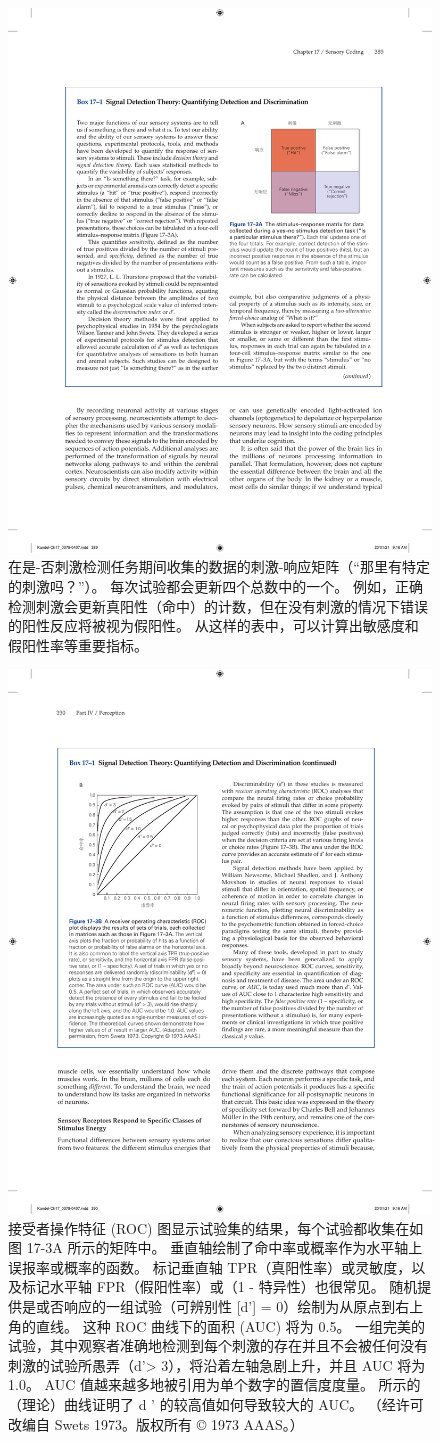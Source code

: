 \begin{figure}[htbp]
	\centering
	\includegraphics[width=0.5\linewidth]{chap17/fig_17_3_a}
	\caption{在是-否刺激检测任务期间收集的数据的刺激-响应矩阵（“那里有特定的刺激吗？”）。
		每次试验都会更新四个总数中的一个。
		例如，正确检测刺激会更新真阳性（命中）的计数，但在没有刺激的情况下错误的阳性反应将被视为假阳性。
		从这样的表中，可以计算出敏感度和假阳性率等重要指标。}
	\label{fig:17_3_a}
\end{figure}

\begin{figure}[htbp]
	\centering
	\includegraphics[width=0.5\linewidth]{chap17/fig_17_3_b}
	\caption{接受者操作特征 (ROC) 图显示试验集的结果，每个试验都收集在如图 17-3A 所示的矩阵中。
		垂直轴绘制了命中率或概率作为水平轴上误报率或概率的函数。
		标记垂直轴 TPR（真阳性率）或灵敏度，以及标记水平轴 FPR（假阳性率）或（1 - 特异性）也很常见。
		随机提供是或否响应的一组试验（可辨别性 [d'] = 0）绘制为从原点到右上角的直线。
		这种 ROC 曲线下的面积 (AUC) 将为 0.5。 一组完美的试验，其中观察者准确地检测到每个刺激的存在并且不会被任何没有刺激的试验所愚弄（d'> 3），将沿着左轴急剧上升，并且 AUC 将为 1.0。 AUC 值越来越多地被引用为单个数字的置信度度量。 所示的（理论）曲线证明了 d ' 的较高值如何导致较大的 AUC。 （经许可改编自 Swets 1973。版权所有 © 1973 AAAS。）}
	\label{fig:17_3_b}
\end{figure}


